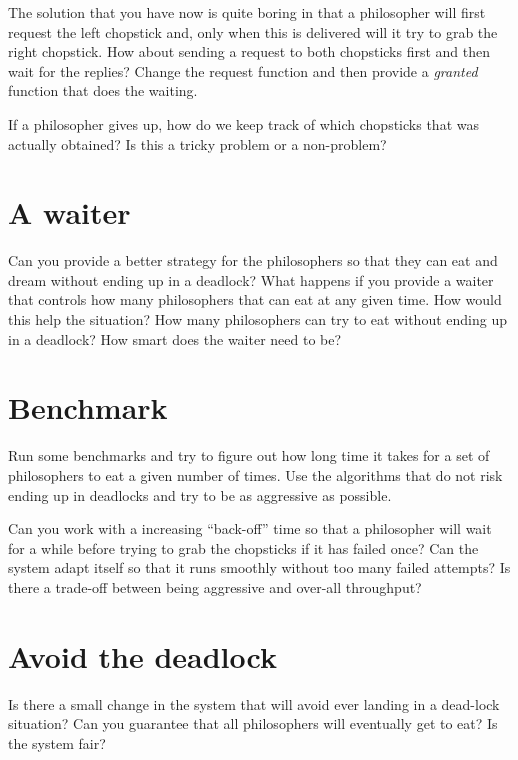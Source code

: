 \documentclass[a4paper,11pt]{article}
\begin{document}
The solution that you have now is quite boring in that a philosopher
will first request the left chopstick and, only when this is delivered
will it try to grab the right chopstick. How about sending a request
to both chopsticks first and then wait for the replies? Change the
request function and then provide a {\em granted} function that does
the waiting. 

If a philosopher gives up, how do we keep track of which chopsticks
that was actually obtained? Is this a tricky problem or a non-problem?



\section{A waiter}

Can you provide a better strategy for the philosophers so that they
can eat and dream without ending up in a deadlock? What happens if
you provide a waiter that controls how many philosophers that can eat
at any given time. How would this help the situation? How many
philosophers can try to eat without ending up in a deadlock? How
smart does the waiter need to be?



\section{Benchmark}

Run some benchmarks and try to figure out how long time it takes for a
set of philosophers to eat a given number of times. Use the algorithms
that do not risk ending up in deadlocks and try to be as aggressive as
possible.  

Can you work with a increasing ``back-off'' time so that a philosopher
will wait for a while before trying to grab the chopsticks if it has
failed once? Can the system adapt itself so that it runs smoothly
without too many failed attempts? Is there a trade-off between being
aggressive and over-all throughput?



\section{Avoid the deadlock}

Is there a small change in the system that will avoid ever landing in
a dead-lock situation? Can you guarantee that all philosophers will
eventually get to eat? Is the system fair?
\end{document}
